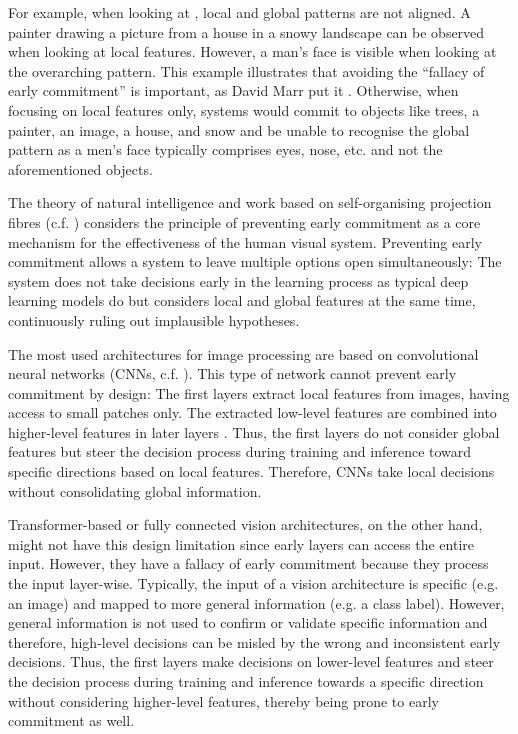 For example, when looking at , local and global patterns are not aligned. A painter drawing a picture from a house in a snowy landscape can be observed when looking at local features. However, a man's face is visible when looking at the overarching pattern.
This example illustrates that avoiding the ``fallacy of early commitment'' is important, as David Marr put it .
Otherwise, when focusing on local features only, systems would commit to objects like trees, a painter, an image, a house, and snow and be unable to recognise the global pattern as a men's face typically comprises eyes, nose, etc. and not the aforementioned objects.

The theory of natural intelligence  and work based on self-organising projection fibres (c.f. ) considers the principle of preventing early commitment as a core mechanism for the effectiveness of the human visual system.
Preventing early commitment allows a system to leave multiple options open simultaneously: The system does not take decisions early in the learning process as typical deep learning models do but considers local and global features at the same time, continuously ruling out implausible hypotheses.

The most used architectures for image processing are based on convolutional neural networks (CNNs, c.f. ). This type of network cannot prevent early commitment by design: The first layers extract local features from images, having access to small patches only. The extracted low-level features are combined into higher-level features in later layers . Thus, the first layers do not consider global features but steer the decision process during training and inference toward specific directions based on local features. Therefore, CNNs take local decisions without consolidating global information.

Transformer-based  or fully connected  vision architectures, on the other hand, might not have this design limitation since early layers can access the entire input.
However, they have a fallacy of early commitment because they process the input layer-wise. Typically, the input of a vision architecture is specific (e.g. an image) and mapped to more general information (e.g. a class label).
However, general information is not used to confirm or validate specific information and therefore, high-level decisions can be misled by the wrong and inconsistent early decisions.
Thus, the first layers make decisions on lower-level features and steer the decision process during training and inference towards a specific direction without considering higher-level features, thereby being prone to early commitment as well.

